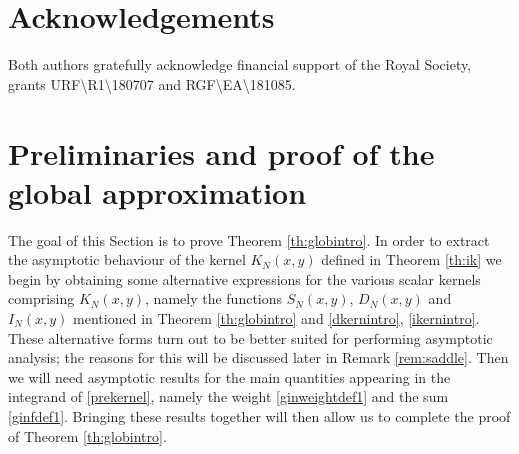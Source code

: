\documentclass[11pt,reqno]{amsproc}
\numberwithin{equation}{section}
\numberwithin{theorem}{section}
\begin{document}
\section*{Acknowledgements}
Both authors gratefully acknowledge financial support of the Royal Society, grants URF\textbackslash R1\textbackslash 180707 and RGF\textbackslash EA\textbackslash 181085.

\section{Preliminaries and proof of the global approximation}
\label{se:prelims}
The goal of this Section is to prove Theorem \ref{th:globintro}. In order to extract the asymptotic behaviour of the kernel $K_{N}(x,y)$ defined in Theorem \ref{th:ik} we begin by obtaining some alternative expressions for the various scalar kernels comprising $K_{N}(x,y)$, namely the functions $S_{N}(x,y)$, $D_{N}(x,y)$ and $I_{N}(x,y)$ mentioned in Theorem \ref{th:globintro} and \eqref{dkernintro}, \eqref{ikernintro}. These alternative forms turn out to be better suited for performing asymptotic analysis; the reasons for this will be discussed later in Remark \ref{rem:saddle}. Then we will need asymptotic results for the main quantities appearing in the integrand of \eqref{prekernel}, namely the weight \eqref{ginweightdef1} and the sum \eqref{ginfdef1}. Bringing these results together will then allow us to complete the proof of Theorem \ref{th:globintro}.
\end{document}
